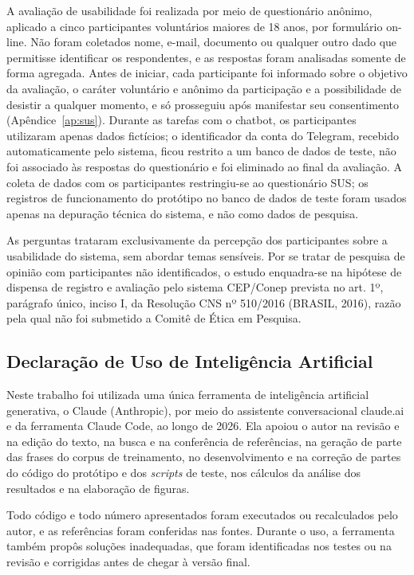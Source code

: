 \documentclass[12pt,a4paper]{extarticle}
\begin{document}
A avaliação de usabilidade foi realizada por meio de questionário anônimo, aplicado a cinco participantes voluntários maiores de 18 anos, por formulário on-line. Não foram coletados nome, e-mail, documento ou qualquer outro dado que permitisse identificar os respondentes, e as respostas foram analisadas somente de forma agregada. Antes de iniciar, cada participante foi informado sobre o objetivo da avaliação, o caráter voluntário e anônimo da participação e a possibilidade de desistir a qualquer momento, e só prosseguiu após manifestar seu consentimento (Apêndice~\ref{ap:sus}). Durante as tarefas com o chatbot, os participantes utilizaram apenas dados fictícios; o identificador da conta do Telegram, recebido automaticamente pelo sistema, ficou restrito a um banco de dados de teste, não foi associado às respostas do questionário e foi eliminado ao final da avaliação. A coleta de dados com os participantes restringiu-se ao questionário SUS; os registros de funcionamento do protótipo no banco de dados de teste foram usados apenas na depuração técnica do sistema, e não como dados de pesquisa.

As perguntas trataram exclusivamente da percepção dos participantes sobre a usabilidade do sistema, sem abordar temas sensíveis. Por se tratar de pesquisa de opinião com participantes não identificados, o estudo enquadra-se na hipótese de dispensa de registro e avaliação pelo sistema CEP/Conep prevista no art. 1º, parágrafo único, inciso I, da Resolução CNS nº 510/2016 (BRASIL, 2016), razão pela qual não foi submetido a Comitê de Ética em Pesquisa.


\subsection{Declaração de Uso de Inteligência Artificial}
\label{sec:declaracao-ia}

Neste trabalho foi utilizada uma única ferramenta de inteligência artificial generativa, o Claude (Anthropic), por meio do assistente conversacional claude.ai e da ferramenta Claude Code, ao longo de 2026. Ela apoiou o autor na revisão e na edição do texto, na busca e na conferência de referências, na geração de parte das frases do corpus de treinamento, no desenvolvimento e na correção de partes do código do protótipo e dos \textit{scripts} de teste, nos cálculos da análise dos resultados e na elaboração de figuras.

Todo código e todo número apresentados foram executados ou recalculados pelo autor, e as referências foram conferidas nas fontes. Durante o uso, a ferramenta também propôs soluções inadequadas, que foram identificadas nos testes ou na revisão e corrigidas antes de chegar à versão final.
\end{document}

